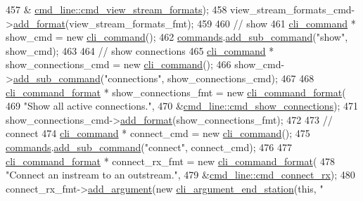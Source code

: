 \begin{DoxyCode}
457                                                                           &
      \hyperlink{classcmd__line_a9f3fe210169a28594ccb54ac28ed8123}{cmd\_line::cmd\_view\_stream\_formats});
458     view\_stream\_formats\_cmd->\hyperlink{classcli__command_aa9ec38e761644d946f8db2b920e39921}{add\_format}(view\_stream\_formats\_fmt);
459 
460     \textcolor{comment}{// show}
461     \hyperlink{classcli__command}{cli\_command} * show\_cmd = \textcolor{keyword}{new} \hyperlink{classcli__command}{cli\_command}();
462     \hyperlink{classcmd__line_ae4fea670c2fdd2b60f7b5b6ad6fbaf1e}{commands}.\hyperlink{classcli__command_aa73a67e8ebb6facd4b40ced66279b226}{add\_sub\_command}(\textcolor{stringliteral}{"show"}, show\_cmd);
463 
464     \textcolor{comment}{// show connections}
465     \hyperlink{classcli__command}{cli\_command} * show\_connections\_cmd = \textcolor{keyword}{new} \hyperlink{classcli__command}{cli\_command}();
466     show\_cmd->\hyperlink{classcli__command_aa73a67e8ebb6facd4b40ced66279b226}{add\_sub\_command}(\textcolor{stringliteral}{"connections"}, show\_connections\_cmd);
467 
468     \hyperlink{classcli__command__format}{cli\_command\_format} * show\_connections\_fmt = \textcolor{keyword}{new} 
      \hyperlink{classcli__command__format}{cli\_command\_format}(
469         \textcolor{stringliteral}{"Show all active connections."},
470         &\hyperlink{classcmd__line_a3154e7ccbcc97337b905604d2756f5d1}{cmd\_line::cmd\_show\_connections});
471     show\_connections\_cmd->\hyperlink{classcli__command_aa9ec38e761644d946f8db2b920e39921}{add\_format}(show\_connections\_fmt);
472 
473     \textcolor{comment}{// connect}
474     \hyperlink{classcli__command}{cli\_command} * connect\_cmd = \textcolor{keyword}{new} \hyperlink{classcli__command}{cli\_command}();
475     \hyperlink{classcmd__line_ae4fea670c2fdd2b60f7b5b6ad6fbaf1e}{commands}.\hyperlink{classcli__command_aa73a67e8ebb6facd4b40ced66279b226}{add\_sub\_command}(\textcolor{stringliteral}{"connect"}, connect\_cmd);
476 
477     \hyperlink{classcli__command__format}{cli\_command\_format} * connect\_rx\_fmt = \textcolor{keyword}{new} 
      \hyperlink{classcli__command__format}{cli\_command\_format}(
478         \textcolor{stringliteral}{"Connect an instream to an outstream."},
479         &\hyperlink{classcmd__line_a2c30ba2b18769889b2402e945919e600}{cmd\_line::cmd\_connect\_rx});
480     connect\_rx\_fmt->\hyperlink{classcli__command__format_ac3fc6d13a227c195d5ee6f7b78eba9cd}{add\_argument}(\textcolor{keyword}{new} \hyperlink{classcli__argument__end__station}{cli\_argument\_end\_station}(\textcolor{keyword}{this}, \textcolor{stringliteral}{"
}
\end{DoxyCode}
